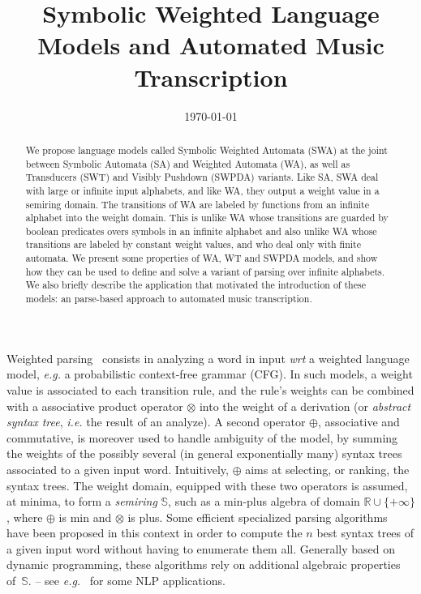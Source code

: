 \documentclass[runningheads]{llncs}
\title{Symbolic Weighted Language Models and Automated Music Transcription}
\date{\today}
\def\ie{\textit{i.e.}\xspace}
\def\eg{\textit{e.g.}\xspace}
\def\wrt{\textit{wrt}\xspace}
\newcommand{\Semiring}{\mathbb{S}}
\begin{document}
\thispagestyle{empty}
\maketitle

\begin{abstract}

We propose language models called Symbolic Weighted Automata (SWA) 
at the joint %
between Symbolic Automata (SA) and Weighted Automata (WA), 
as well as Transducers (SWT) and Visibly Pushdown (SWPDA) variants.
%
Like SA, SWA deal with large or infinite input alphabets, 
and like WA, they output a weight value in a semiring domain.
The transitions of WA are labeled by functions from an infinite alphabet into the weight domain. 
This is unlike WA whose transitions are guarded by boolean predicates 
overs symbols in an infinite alphabet 
and also unlike WA whose transitions are labeled by constant weight values, 
and who deal only with finite automata.
%
We present some properties of WA, WT and SWPDA models, 
and show how they can be used to define and solve a variant of parsing 
over infinite alphabets.
%
We also briefly describe the application that motivated the introduction of these models: 
an parse-based approach to automated music transcription.
\end{abstract}




Weighted parsing~\cite{Goodman99SemiringParsing,Nederhof03weightedParsing,MorbitzVogler19weighted-parsing} 
consists in analyzing a word in input \wrt a weighted language model, \eg a probabilistic context-free grammar (CFG).
In such models, a weight value is associated to each transition rule, %
and the rule's weights can be combined with a associative product operator $\otimes$ into 
the weight of a derivation (or \emph{abstract syntax tree}, \ie the result of an analyze).
A second operator $\oplus$, associative and commutative, 
is moreover used to handle ambiguity of the model, 
by summing the weights of the possibly several (in general exponentially many) 
syntax trees associated to a given input word.
Intuitively, $\oplus$ aims at selecting, or ranking, the syntax trees.
The weight domain, equipped with these two operators is assumed, at minima, 
to form a \emph{semiring} $\Semiring$, %
such as a min-plus algebra of domain $\mathbb{R} \cup \{ +\infty\}$, 
where $\oplus$ is min and $\otimes$ is plus.
Some efficient specialized parsing algorithms~\cite{Huang05kbest} have been proposed in this context 
in order to compute the $n$ best syntax trees of a given input word without having to enumerate them all.
Generally based on dynamic programming, these algorithms rely on 
additional algebraic properties of~$\Semiring$.
-- see \eg~\cite{Huang05kbest} for some NLP applications.
\end{document}
